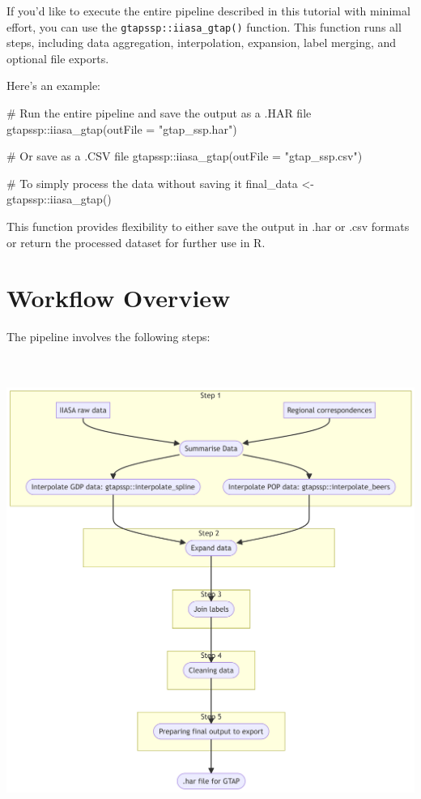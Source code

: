 \documentclass[
  letterpaper,
  DIV=11,
  numbers=noendperiod]{scrartcl}
\newenvironment{Shaded}{}{}
\newcommand{\AttributeTok}[1]{\textcolor[rgb]{0.00,0.34,0.68}{#1}}
\newcommand{\CommentTok}[1]{\textcolor[rgb]{0.54,0.53,0.53}{#1}}
\newcommand{\FunctionTok}[1]{\textcolor[rgb]{0.39,0.29,0.61}{#1}}
\newcommand{\NormalTok}[1]{\textcolor[rgb]{0.12,0.11,0.11}{#1}}
\newcommand{\OtherTok}[1]{\textcolor[rgb]{0.00,0.43,0.16}{#1}}
\newcommand{\SpecialCharTok}[1]{\textcolor[rgb]{0.24,0.68,0.91}{#1}}
\newcommand{\StringTok}[1]{\textcolor[rgb]{0.75,0.01,0.01}{#1}}
\begin{document}
If you'd like to execute the entire pipeline described in this tutorial
with minimal effort, you can use the \texttt{gtapssp::iiasa\_gtap()}
function. This function runs all steps, including data aggregation,
interpolation, expansion, label merging, and optional file exports.

Here's an example:

\begin{Shaded}
\begin{Highlighting}[]
\CommentTok{\# Run the entire pipeline and save the output as a .HAR file}
\NormalTok{gtapssp}\SpecialCharTok{::}\FunctionTok{iiasa\_gtap}\NormalTok{(}\AttributeTok{outFile =} \StringTok{"gtap\_ssp.har"}\NormalTok{)}

\CommentTok{\# Or save as a .CSV file}
\NormalTok{gtapssp}\SpecialCharTok{::}\FunctionTok{iiasa\_gtap}\NormalTok{(}\AttributeTok{outFile =} \StringTok{"gtap\_ssp.csv"}\NormalTok{)}

\CommentTok{\# To simply process the data without saving it}
\NormalTok{final\_data }\OtherTok{\textless{}{-}}\NormalTok{ gtapssp}\SpecialCharTok{::}\FunctionTok{iiasa\_gtap}\NormalTok{()}
\end{Highlighting}
\end{Shaded}

This function provides flexibility to either save the output in .har or
.csv formats or return the processed dataset for further use in R.

\section{Workflow Overview}\label{workflow-overview}

The pipeline involves the following steps:

\label{workflow-pipeline}
\includegraphics[width=8in,height=6in]{index_files/figure-latex/mermaid-figure-1.png}
\end{document}
